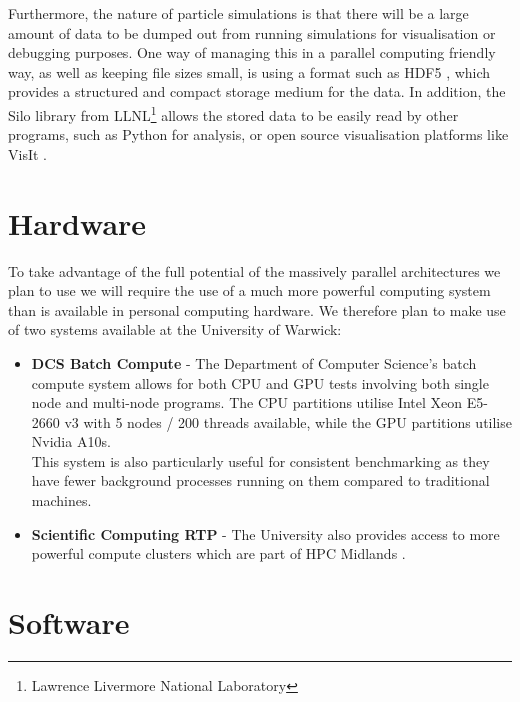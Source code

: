 Furthermore, the nature of particle simulations is that there will be a large amount of data to be dumped out from running simulations for visualisation or debugging purposes. One way of managing this in a parallel computing friendly way, as well as keeping file sizes small, is using a format such as HDF5 \cite{hdf5}, which provides a structured and compact storage medium for the data. In addition, the Silo \cite{silo} library from LLNL\footnote{Lawrence Livermore National Laboratory} allows the stored data to be easily read by other programs, such as Python for analysis, or open source visualisation platforms like VisIt \cite{visit}.

\section{Hardware}

To take advantage of the full potential of the massively parallel architectures we plan to use we will require the use of a much more powerful computing system than is available in personal computing hardware. We therefore plan to make use of two systems available at the University of Warwick:

\begin{itemize}
    \item \textbf{DCS Batch Compute} - The Department of Computer Science's batch compute system allows for both CPU and GPU tests involving both single node and multi-node programs. The CPU partitions utilise Intel Xeon E5-2660 v3 with 5 nodes / 200 threads available, while the GPU partitions utilise Nvidia A10s. \\ 
    This system is also particularly useful for consistent benchmarking as they have fewer background processes running on them compared to traditional machines.
    \item \textbf{Scientific Computing RTP} - The University also provides access to more powerful compute clusters which are part of HPC Midlands \cite{scrtp}.
\end{itemize}

\section{Software}

